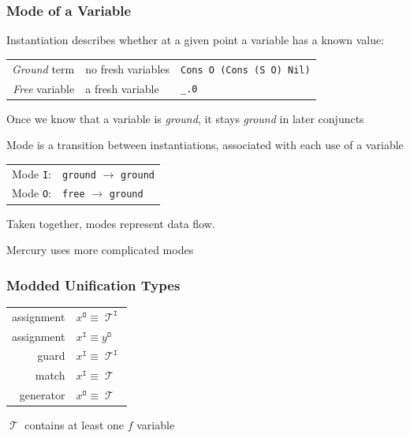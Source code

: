 \documentclass[xcolor=table, aspectratio=169]{beamer}
\DeclareMathOperator{\Term}{\mathcal{T}}
\DeclareMathOperator{\inmode}{\mathtt{I}}
\DeclareMathOperator{\outmode}{\mathtt{O}}
\begin{document}
\begin{frame}[fragile]
  \frametitle{Mode of a Variable}
\begin{center}

Instantiation describes whether at a given point a variable has a known value:

\begin{tabular}{rll}
  \emph{Ground} term & no fresh variables & \lstinline|Cons O (Cons (S O) Nil)| \\
  \emph{Free} variable & a fresh variable & \lstinline|_.0|
\end{tabular}

\vfill

Once we know that a variable is \emph{ground}, it stays \emph{ground} in later conjuncts
\end{center}

\vfill

\begin{center}
Mode is a transition between instantiations, associated with each use of a variable

\vfill

\begin{tabular}{rl}
  Mode \lstinline|I|: & \lstinline|ground| $\rightarrow$ \lstinline|ground| \\
  Mode \lstinline|O|: & \lstinline|free| $\rightarrow$ \lstinline|ground|
\end{tabular}

Taken together, modes represent data flow.
\end{center}

\vfill

\hfill \footnotesize Mercury uses more complicated modes

\end{frame}

\begin{frame}[fragile]
  \frametitle{Modded Unification Types}

\begin{center}
\begin{tabular}{rl}
  assignment & $x^{\outmode} \equiv \Term^{\inmode} $ \\
  assignment & $x^{\inmode}  \equiv y^{\outmode}    $ \\
  guard      & $x^{\inmode}  \equiv \Term^{\inmode} $ \\
  match      & $x^{\inmode}  \equiv \Term           $ \\
  generator  & $x^{\outmode} \equiv \Term           $
\end{tabular}
\end{center}

\hfill \footnotesize $\Term$ contains at least one $f$ variable
\end{frame}
\end{document}
